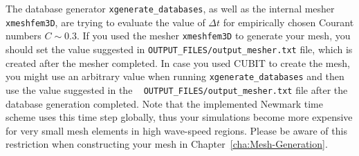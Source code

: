 The database generator \texttt{xgenerate\_databases}, as well as the
internal mesher \texttt{xmeshfem3D}, are trying to evaluate the value
of $\Delta t$ for empirically chosen Courant numbers $C\sim0.3$.
If you used the mesher \texttt{xmeshfem3D} to generate your mesh,
you should set the value suggested in \texttt{OUTPUT\_FILES/output\_mesher.txt}
file, which is created after the mesher completed. In case you used
CUBIT to create the mesh, you might use an arbitrary value when running
\texttt{xgenerate\_databases} and then use the value suggested in
the ~\newline
 \texttt{OUTPUT\_FILES/output\_mesher.txt} file after the database
generation completed. Note that the implemented Newmark time scheme
uses this time step globally, thus your simulations become more expensive
for very small mesh elements in high wave-speed regions. Please be
aware of this restriction when constructing your mesh in Chapter~\ref{cha:Mesh-Generation}.

